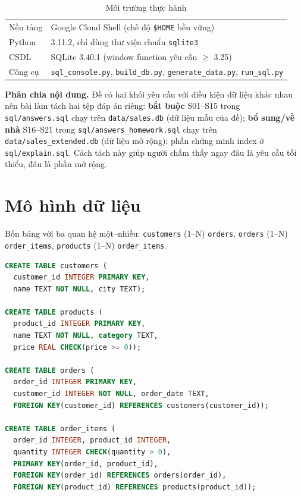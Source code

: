 \documentclass[10pt,a4paper,twocolumn]{article}
\newcommand{\code}[1]{\texttt{\small #1}}
\begin{document}
\begin{table}[H]
\centering
\caption{Môi trường thực hành}
\label{tab:env}
\scriptsize
\begin{tabularx}{\linewidth}{@{}l X@{}}
\toprule
Nền tảng & Google Cloud Shell (chế độ \code{\$HOME} bền vững) \\
Python & 3.11.2, chỉ dùng thư viện chuẩn \code{sqlite3} \\
CSDL & SQLite 3.40.1 (window function yêu cầu $\geq$ 3.25) \\
Công cụ & \code{sql\_console.py}, \code{build\_db.py}, \code{generate\_data.py}, \code{run\_sql.py} \\
\bottomrule
\end{tabularx}
\end{table}

\textbf{Phân chia nội dung.} Đề có hai khối yêu cầu với điều kiện dữ liệu khác nhau nên bài làm
tách hai tệp đáp án riêng: \textbf{bắt buộc} S01--S15 trong \code{sql/answers.sql} chạy trên
\code{data/sales.db} (dữ liệu mẫu của đề); \textbf{bổ sung/về nhà} S16--S21 trong
\code{sql/answers\_homework.sql} chạy trên \code{data/sales\_extended.db} (dữ liệu mở rộng);
phần chứng minh index ở \code{sql/explain.sql}. Cách tách này giúp người chấm thấy ngay đâu là
yêu cầu tối thiểu, đâu là phần mở rộng.

\section{Mô hình dữ liệu}

Bốn bảng với ba quan hệ một--nhiều: \code{customers} (1--N) \code{orders},
\code{orders} (1--N) \code{order\_items}, \code{products} (1--N) \code{order\_items}.

\begin{lstlisting}[language=SQL,caption={Trích \code{sql/schema.sql}}]
CREATE TABLE customers (
  customer_id INTEGER PRIMARY KEY,
  name TEXT NOT NULL, city TEXT);

CREATE TABLE products (
  product_id INTEGER PRIMARY KEY,
  name TEXT NOT NULL, category TEXT,
  price REAL CHECK(price >= 0));

CREATE TABLE orders (
  order_id INTEGER PRIMARY KEY,
  customer_id INTEGER NOT NULL, order_date TEXT,
  FOREIGN KEY(customer_id) REFERENCES customers(customer_id));

CREATE TABLE order_items (
  order_id INTEGER, product_id INTEGER,
  quantity INTEGER CHECK(quantity > 0),
  PRIMARY KEY(order_id, product_id),
  FOREIGN KEY(order_id) REFERENCES orders(order_id),
  FOREIGN KEY(product_id) REFERENCES products(product_id));
\end{lstlisting}
\end{document}
